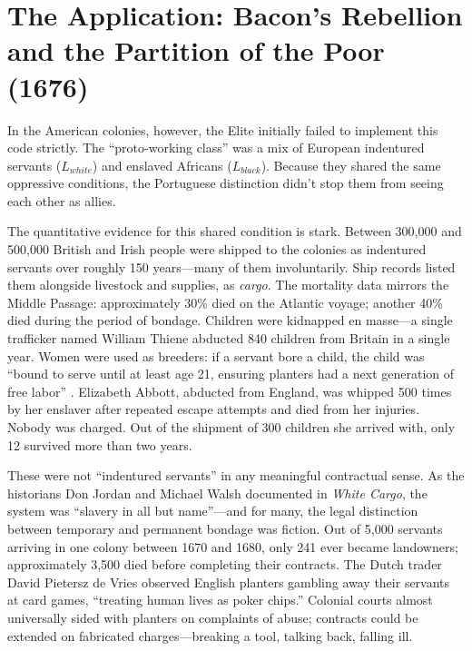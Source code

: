\documentclass[12pt,openany]{book}
\begin{document}
\section{The Application: Bacon's Rebellion and the Partition of the Poor (1676)}
In the American colonies, however, the Elite initially failed to implement this code strictly. The ``proto-working class'' was a mix of European indentured servants ($L_{white}$) and enslaved Africans ($L_{black}$). Because they shared the same oppressive conditions, the Portuguese distinction didn't stop them from seeing each other as allies.

The quantitative evidence for this shared condition is stark. Between 300,000 and 500,000 British and Irish people were shipped to the colonies as indentured servants over roughly 150 years---many of them involuntarily. Ship records listed them alongside livestock and supplies, as \textit{cargo}. The mortality data mirrors the Middle Passage: approximately 30\% died on the Atlantic voyage; another 40\% died during the period of bondage. Children were kidnapped en masse---a single trafficker named William Thiene abducted 840 children from Britain in a single year. Women were used as breeders: if a servant bore a child, the child was ``bound to serve until at least age 21, ensuring planters had a next generation of free labor'' \cite{jordan2008}. Elizabeth Abbott, abducted from England, was whipped 500 times by her enslaver after repeated escape attempts and died from her injuries. Nobody was charged. Out of the shipment of 300 children she arrived with, only 12 survived more than two years.

These were not ``indentured servants'' in any meaningful contractual sense. As the historians Don Jordan and Michael Walsh documented in \textit{White Cargo}, the system was ``slavery in all but name''---and for many, the legal distinction between temporary and permanent bondage was fiction. Out of 5,000 servants arriving in one colony between 1670 and 1680, only 241 ever became landowners; approximately 3,500 died before completing their contracts. The Dutch trader David Pietersz de Vries observed English planters gambling away their servants at card games, ``treating human lives as poker chips.'' Colonial courts almost universally sided with planters on complaints of abuse; contracts could be extended on fabricated charges---breaking a tool, talking back, falling ill.
\end{document}

